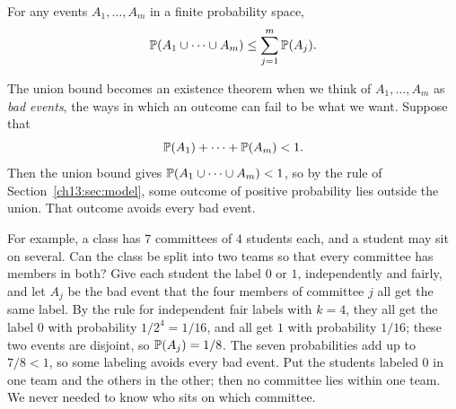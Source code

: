 \par\noindent\begin{minipage}{\linewidth}
\begin{proposition}\label{ch13:prop:union}
For any events $A_1,\ldots,A_m$ in a finite probability space,
\[
\operatorname{\mathbb P}(A_1\cup\cdots\cup A_m)\le\sum_{j=1}^m\operatorname{\mathbb P}(A_j).
\]
\end{proposition}
\end{minipage}\par

The union bound becomes an existence theorem when we think of $A_1,\ldots,A_m$ as \emph{bad events}, the ways in which an outcome can fail to be what we want. Suppose that
\[
\operatorname{\mathbb P}(A_1)+\cdots+\operatorname{\mathbb P}(A_m)<1.
\]
Then the union bound gives $\operatorname{\mathbb P}(A_1\cup\cdots\cup A_m)<1$, so by the rule of Section~\ref{ch13:sec:model}, some outcome of positive probability lies outside the union. That outcome avoids every bad event.

For example, a class has $7$ committees of $4$ students each, and a student may sit on several. Can the class be split into two teams so that every committee has members in both? Give each student the label $0$ or $1$, independently and fairly, and let $A_j$ be the bad event that the four members of committee $j$ all get the same label. By the rule for independent fair labels with $k=4$, they all get the label $0$ with probability $1/2^4=1/16$, and all get $1$ with probability $1/16$; these two events are disjoint, so $\operatorname{\mathbb P}(A_j)=1/8$. The seven probabilities add up to $7/8<1$, so some labeling avoids every bad event. Put the students labeled $0$ in one team and the others in the other; then no committee lies within one team. We never needed to know who sits on which committee.

